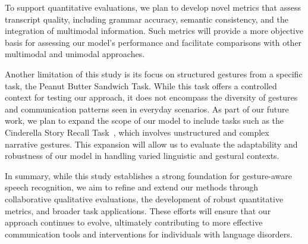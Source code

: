 To support quantitative evaluations, we plan to develop novel metrics that assess transcript quality, including grammar accuracy, semantic consistency, and the integration of multimodal information. Such metrics will provide a more objective basis for assessing our model's performance and facilitate comparisons with other multimodal and unimodal approaches.

Another limitation of this study is its focus on structured gestures from a specific task, the Peanut Butter Sandwich Task. While this task offers a controlled context for testing our approach, it does not encompass the diversity of gestures and communication patterns seen in everyday scenarios. As part of our future work, we plan to expand the scope of our model to include tasks such as the Cinderella Story Recall Task~\cite{bird1996cinderella}, which involves unstructured and complex narrative gestures. This expansion will allow us to evaluate the adaptability and robustness of our model in handling varied linguistic and gestural contexts.

In summary, while this study establishes a strong foundation for gesture-aware speech recognition, we aim to refine and extend our methods through collaborative qualitative evaluations, the development of robust quantitative metrics, and broader task applications. These efforts will ensure that our approach continues to evolve, ultimately contributing to more effective communication tools and interventions for individuals with language disorders.



